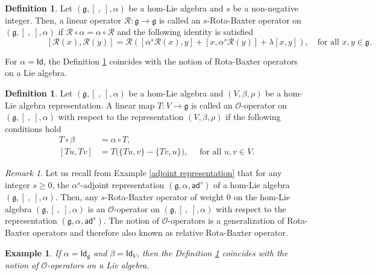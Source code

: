 \documentclass[a4paper,11pt]{amsart}
\theoremstyle{plain}
\newtheorem{example}[theorem]{Example}
\theoremstyle{definition}
\newtheorem{definition}[theorem]{Definition}
\theoremstyle{remark}
\newtheorem{remark}[theorem]{Remark}
\numberwithin{equation}{section}
\begin{document}
\begin{definition}\label{def:Rota-Baxter operators}
Let $(\mathfrak{g},[~,~],\alpha)$ be a hom-Lie algebra and $s$ be a non-negative integer. Then, a linear operator $\mathcal{R}: \mathfrak{g} \rightarrow \mathfrak{g}$ is called an $s$-Rota-Baxter operator on $(\mathfrak{g},[~,~],\alpha)$ if $\mathcal{R}\circ \alpha= \alpha\circ \mathcal{R}$ and the following identity is satisfied
\begin{equation*} 
\quad\quad\quad\quad\quad[\mathcal{R}(x), \mathcal{R}(y)]= \mathcal{R}([\alpha^s \mathcal{R}(x), y]+ [x, \alpha^s \mathcal{R}(y)]+\lambda [x,y]),\quad\mbox{for all }x,y\in \mathfrak{g}.
\end{equation*}
\end{definition}


For $\alpha=\mathsf{Id}$, the Definition \ref{def:Rota-Baxter operators} coincides with the notion of Rota-Baxter operators on a Lie algebra. 

\begin{definition}\label{O-operator}
Let $(\mathfrak{g},[~,~],\alpha)$ be a hom-Lie algebra and $(V,\beta,\rho)$ be a hom-Lie algebra representation. A linear map $T:V\rightarrow \mathfrak{g}$ is called an $\mathcal{O}$-operator on $(\mathfrak{g},[~,~],\alpha)$ with respect to the representation $(V,\beta,\rho)$ if the following conditions hold
\begin{align*}
T\circ\beta&=\alpha\circ T,\\
[Tu,Tv]&=T\big(\{Tu,v\}-\{Tv,u\}\big),\quad\mbox{ for all }  u,v\in V.
\end{align*}
\end{definition}

\begin{remark}\label{5.2}
Let us recall from Example \ref{adjoint representation} that for any integer $s\geq 0$, the $\alpha^s$-adjoint representation $(\mathfrak{g}, \alpha, \mathsf{ad}^s)$ of a hom-Lie algebra $(\mathfrak{g},[~,~],\alpha)$. Then, any $s$-Rota-Baxter operator of weight $0$ on the hom-Lie algebra $(\mathfrak{g},[~,~],\alpha)$ is an $\mathcal{O}$-operator on $(\mathfrak{g},[~,~],\alpha)$ with respect to the representation $(\mathfrak{g}, \alpha, \mathsf{ad}^s)$.
The notion of $\mathcal{O}$-operators is a generalization of Rota-Baxter operators and therefore also known as relative Rota-Baxter operator.
\end{remark}


\begin{example}
If $\alpha=\mathsf{Id}_{\mathfrak{g}}$ and $\beta=\mathsf{Id}_V$, then the Definition \ref{O-operator} coincides with the notion of $\mathcal{O}$-operators on a Lie algebra. 
\end{example}
\end{document}

